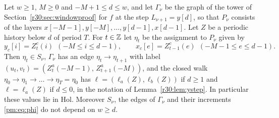 \begin{lemma}\label{pm:lem:loops}
Let $w\ge1$, $M\ge0$ and $-M+1\le d\le w$, and let $\Gamma_\nu$ be the graph of the tower of Section~\ref{r30:sec:windowproof} for $f$ at the step $L_{\nu+1}=y[d]$, so that $P_\nu$ consists of the layers $x[-M-1],y[-M],\dots,y[d-1],x[d-1]$. Let $Z$ be a periodic history below $d$ of period $T$. For $t\in\mathbb{Z}$ let $\eta_t$ be the assignment to $P_\nu$ given by
\[
y_c[i]=Z^c_t(i)\ \ (-M\le i\le d-1),\qquad x_c[e]=Z^c_{t-1}(e)\ \ (-M-1\le e\le d-1).
\]
Then $\eta_t\in S_\nu$, $\Gamma_\nu$ has an edge $\eta_t\to\eta_{t+1}$ with label $(u_t,v_t)=(Z^a_t(-M-1),\,Z^a_{t+1}(-M))$, and the closed walk $\eta_0\to\eta_1\to\dots\to\eta_T=\eta_0$ has $\ell=(\ell_a(Z),\ell_b(Z))$ if $d\ge1$ and $\ell=\ell_a(Z)$ if $d\le0$, in the notation of Lemma~\ref{r30:lem:ystep}. In particular these values lie in $\mathrm{Hol}$. Moreover $S_\nu$, the edges of $\Gamma_\nu$ and their increments \eqref{pm:eq:phi} do not depend on $w\ge d$.
\end{lemma}

